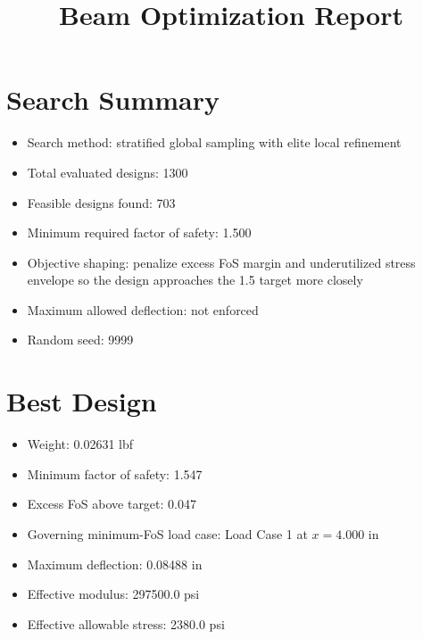 \documentclass[11pt]{article}
\title{Beam Optimization Report}
\date{}
\begin{document}
\maketitle

\section*{Search Summary}
\begin{itemize}
\item Search method: stratified global sampling with elite local refinement
\item Total evaluated designs: 1300
\item Feasible designs found: 703
\item Minimum required factor of safety: 1.500
\item Objective shaping: penalize excess FoS margin and underutilized stress envelope so the design approaches the 1.5 target more closely
\item Maximum allowed deflection: not enforced
\item Random seed: 9999
\end{itemize}

\section*{Best Design}
\begin{itemize}
\item Weight: 0.02631 lbf
\item Minimum factor of safety: 1.547
\item Excess FoS above target: 0.047
\item Governing minimum-FoS load case: Load Case 1 at $x=4.000$ in
\item Maximum deflection: 0.08488 in
\item Effective modulus: 297500.0 psi
\item Effective allowable stress: 2380.0 psi
\end{itemize}
\end{document}
